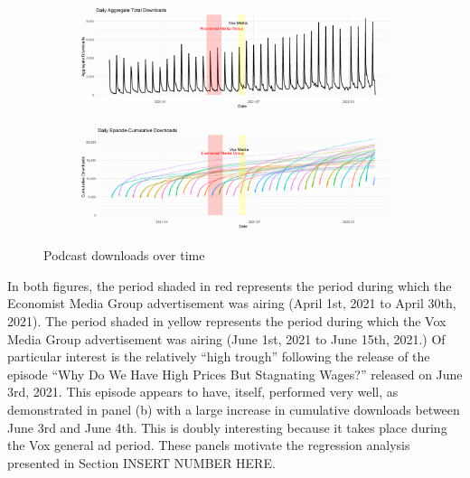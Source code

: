 \documentclass[11pt, letterpaper, twoside]{article}
\begin{document}
\begin{landscape}
    \thispagestyle{empty}
    \begin{figure}[h]
        \centering
        \begin{subfigure}[h]{\textwidth}
            \centering
            \includegraphics[width=\textwidth]{daily_aggregate_download.png}
            \caption{}
        \end{subfigure}
        \vspace{1em}
        \begin{subfigure}[h]{\textwidth}
            \centering
            \includegraphics[width=\textwidth]{daily_cumulative_download.png}
            \caption{}
        \end{subfigure}
        \caption{Podcast downloads over time}
    \end{figure}
\end{landscape}


In both figures, the period shaded in red represents the period during which the Economist Media Group advertisement was airing (April 1st, 2021 to April 30th, 2021). The period shaded in yellow represents the period during which the Vox Media Group advertisement was airing (June 1st, 2021 to June 15th, 2021.) Of particular interest is the relatively ``high trough'' following the release of the episode ``Why Do We Have High Prices But Stagnating Wages?'' released on June 3rd, 2021. This episode appears to have, itself, performed very well, as demonstrated in panel (b) with a large increase in cumulative downloads between June 3rd and June 4th. This is doubly interesting because it takes place during the Vox general ad period. These panels motivate the regression analysis presented in Section INSERT NUMBER HERE.
\end{document}
